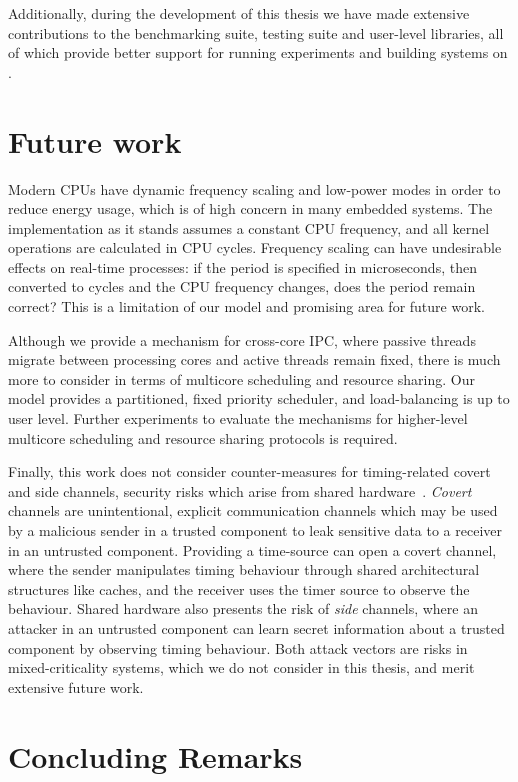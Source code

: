 Additionally, during the development of this thesis we have made extensive contributions to the 
\selfour benchmarking suite, testing suite and user-level libraries, all of which provide better 
support for running experiments and building systems on \selfour. 

\section{Future work}

Modern \glspl{CPU} have dynamic frequency scaling and low-power modes in order to reduce energy usage, which
is of high concern in many embedded systems. The implementation as it stands assumes a constant
\gls{CPU} frequency, and all kernel operations are calculated in \gls{CPU} cycles. Frequency scaling
can have undesirable effects on real-time processes: if the period is specified in microseconds, then
converted to cycles and the CPU frequency changes, does the period remain correct? This is a
limitation of our model and promising area for future work.

Although we provide a mechanism for cross-core IPC, where passive threads migrate between processing
cores and active threads remain fixed, there is much more to consider in terms of multicore
scheduling and resource sharing. Our model provides a partitioned, fixed priority scheduler, and 
load-balancing is up to user level. Further experiments to evaluate the mechanisms for higher-level
multicore scheduling and resource sharing protocols is required. 

Finally, this work does not consider counter-measures for timing-related covert and side channels,
security risks which arise from
shared hardware~\citep{Ge_YCH_18}. \emph{Covert} channels are unintentional, explicit communication
channels which may be used by a malicious sender in a trusted component to leak sensitive data to a receiver
in an untrusted component. Providing a time-source can open a covert channel, where the sender
manipulates timing behaviour through shared architectural structures like caches, and the receiver
uses the timer source to observe the behaviour. Shared hardware also presents the risk of  \emph{side} channels, 
where an attacker in an untrusted
component can learn secret information about a trusted component by observing timing behaviour. 
Both attack vectors are risks in mixed-criticality systems, which we do not consider in this
thesis, and merit extensive future work. 

\section{Concluding Remarks}

